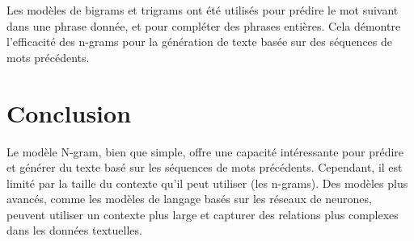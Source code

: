 Les modèles de bigrams et trigrams ont été utilisés pour prédire le mot suivant dans une phrase donnée, et pour compléter des phrases entières. Cela démontre l'efficacité des n-grams pour la génération de texte basée sur des séquences de mots précédents.



\section{Conclusion}

Le modèle N-gram, bien que simple, offre une capacité intéressante pour prédire et générer du texte basé sur les séquences de mots précédents. Cependant, il est limité par la taille du contexte qu'il peut utiliser (les n-grams). Des modèles plus avancés, comme les modèles de langage basés sur les réseaux de neurones, peuvent utiliser un contexte plus large et capturer des relations plus complexes dans les données textuelles.